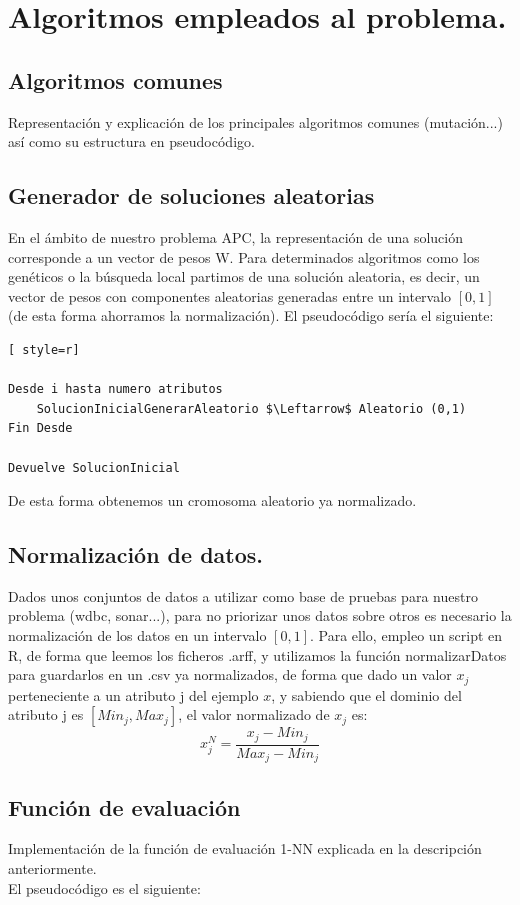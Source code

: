 \section{Algoritmos empleados al problema.}

\subsection{Algoritmos comunes}
Representación y explicación de los principales algoritmos comunes (mutación...) así como su estructura en pseudocódigo.

\subsection{Generador de soluciones aleatorias}
En el ámbito de nuestro problema APC, la representación de una solución corresponde a un vector de pesos W.
Para determinados algoritmos como los genéticos o la búsqueda local partimos de una solución aleatoria, es decir, un vector de pesos con componentes aleatorias generadas entre un intervalo $[0,1]$ (de esta forma ahorramos la normalización). El pseudocódigo sería el siguiente:

\begin{lstlisting}[ style=r]

Desde i hasta numero atributos
	SolucionInicialGenerarAleatorio $\Leftarrow$ Aleatorio (0,1)
Fin Desde

Devuelve SolucionInicial
\end{lstlisting}

De esta forma obtenemos un cromosoma aleatorio ya normalizado.

\subsection{Normalización de datos.}
Dados unos conjuntos de datos a utilizar como base de pruebas para nuestro problema (wdbc, sonar...), para no priorizar unos datos sobre otros es necesario la normalización de los datos en un intervalo $[0,1]$. Para ello, empleo un script en R, de forma que leemos los ficheros .arff, y utilizamos la función normalizarDatos para guardarlos en un .csv ya normalizados, de forma que dado un valor $x_j$ perteneciente a un atributo j del ejemplo $x$, y sabiendo que el dominio del atributo j es $[Min_j, Max_j]$, el valor normalizado de $x_j$ es:
\[
x_j^N = \frac{x_j -Min_j}{Max_j - Min_j}
\]



\subsection{Función de evaluación}
Implementación de la función de evaluación 1-NN explicada en la descripción anteriormente.\\ 
El pseudocódigo es el siguiente:

